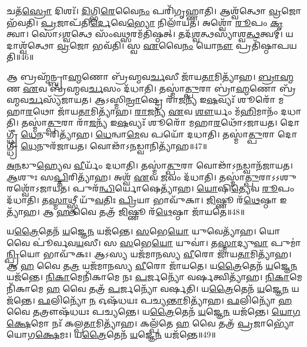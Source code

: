 𑌚𑌤᳴\-\ul{𑌸𑍍𑌰𑍋} 𑌦𑌿𑌶𑌃᳴।
\-\ul{𑌦𑌿}\-𑌗𑍍𑌭𑌿\-\ul{𑌰𑍇}\-𑌵𑍈\-\ul{𑌨𑌂} 𑌪𑌰𑌿᳴𑌗𑍃𑌹𑍍𑌣𑌾𑌤𑌿।
𑌆𑌶𑍍𑌵᳴𑌤𑍍𑌥𑍋 \ul{𑌵𑍍𑌰}\-𑌜𑍋 𑌭᳴𑌵𑌤𑌿।
\-\ul{𑌪𑍍𑌰}\-𑌜𑌾𑌪᳴𑌤𑌿\-\ul{𑌰𑍍𑌦𑍇}\-𑌵𑍇\-\ul{𑌭𑍍𑌯𑍋} 𑌨𑌿𑌲𑌾᳴𑌯𑌤।
𑌅𑌶𑍍𑌵𑍋᳴ \ul{𑌰𑍂}\-𑌪𑌂 \ul{𑌕𑍃}\-𑌤𑍍𑌵𑌾।
𑌸𑍋॑𑌽\-\ul{𑌶𑍍𑌵}\-𑌤𑍍𑌥𑍇 𑌸𑌂᳴𑌵\-\ul{𑌥𑍍𑌸}\-𑌰𑌮᳴𑌤𑌿𑌷𑍍𑌠𑌤𑍍।
𑌤𑌦᳴\-\ul{𑌶𑍍𑌵}\-𑌤𑍍𑌥𑌸𑍍𑌯𑌾॑𑌶𑍍𑌵\-\ul{𑌤𑍍𑌥}\-𑌤𑍍𑌵𑌮𑍍।
𑌯𑌦𑌾𑌶𑍍𑌵᳴𑌤𑍍𑌥𑍋 \ul{𑌵𑍍𑌰}\-𑌜𑍋 𑌭𑌵᳴𑌤𑌿।
𑌸𑍍𑌵 \ul{𑌏}\-𑌵𑍈\-\ul{𑌨𑌂} 𑌯𑍋\-\ul{𑌨𑍗} 𑌪𑍍𑌰𑌤𑌿᳴\-𑌷𑍍𑌠𑌾𑌪𑌯𑌤𑌿॥46॥\anuvakamend[\-\ul{𑌤𑍍𑌰𑌿}\-𑌷𑍍𑌟𑍁\-\ul{𑌭}\-𑌶𑍍𑌛\-\ul{𑌨𑍍𑌦}\-𑌸𑍋𑌽\-\ul{𑌧𑌿} 𑌨𑌿𑌰𑍍𑌮𑌿᳴𑌮𑍀𑌤𑍇 𑌜𑍁𑌹𑍋\-\ul{𑌤𑌿} 𑌨𑌵᳴ 𑌚]

𑌆 𑌬𑍍𑌰𑌹𑍍𑌮᳴𑌨𑍍𑌬𑍍𑌰𑌾\-\ul{𑌹𑍍𑌮}\-𑌣𑍋 𑌬𑍍𑌰᳴𑌹𑍍𑌮𑌵\-\ul{𑌰𑍍𑌚}\-𑌸𑍀 𑌜𑌾᳴𑌯\-\ul{𑌤𑌾}\-𑌮𑌿𑌤𑍍𑌯𑌾᳴𑌹।
\-\ul{𑌬𑍍𑌰𑌾}\-\-\ul{𑌹𑍍𑌮}\-𑌣 \ul{𑌏}\-𑌵 𑌬𑍍𑌰᳴𑌹𑍍𑌮𑌵\-\ul{𑌰𑍍𑌚}\-𑌸𑌂 𑌦᳴𑌧𑌾𑌤𑌿।
𑌤𑌸𑍍𑌮𑌾॑\-\ul{𑌤𑍍𑌪𑍁}\-𑌰𑌾 𑌬𑍍𑌰𑌾॑\-\ul{𑌹𑍍𑌮}\-𑌣𑍋 𑌬𑍍𑌰᳴𑌹𑍍𑌮𑌵\-\ul{𑌰𑍍𑌚}\-𑌸𑍍𑌯᳴𑌜𑌾𑌯𑌤।
𑌆𑌽𑌸𑍍𑌮𑌿\-\ul{𑌨𑍍𑌰𑌾}\-𑌷𑍍𑌟𑍍𑌰𑍇 𑌰𑌾᳴\-\ul{𑌜}\-𑌨𑍍𑌯᳴ 𑌇\-\ul{𑌷}\-𑌵𑍍𑌯𑌃᳴ 𑌶𑍂𑌰𑍋᳴ 𑌮𑌹𑌾\-\ul{𑌰}\-𑌥𑍋 𑌜𑌾᳴𑌯\-\ul{𑌤𑌾}\-𑌮𑌿𑌤𑍍𑌯𑌾᳴𑌹।
\-\ul{𑌰𑌾}\-\-\ul{𑌜}\-𑌨𑍍𑌯᳴ \ul{𑌏}\-𑌵 \ul{𑌶𑍗}\-𑌰𑍍𑌯𑌂 𑌮᳴\-\ul{𑌹𑌿}\-𑌮𑌾𑌨𑌂᳴ 𑌦𑌧𑌾𑌤𑌿।
𑌤𑌸𑍍𑌮𑌾॑\-\ul{𑌤𑍍𑌪𑍁}\-𑌰𑌾 𑌰𑌾᳴\-\ul{𑌜}\-𑌨𑍍𑌯᳴ 𑌇\-\ul{𑌷}\-𑌵𑍍𑌯𑌃᳴ 𑌶𑍂𑌰𑍋᳴ 𑌮𑌹𑌾\-\ul{𑌰}\-𑌥𑍋᳴\-𑌽𑌜𑌾𑌯𑌤।
𑌦𑍋𑌗𑍍𑌧𑍍𑌰𑍀᳴ \ul{𑌧𑍇}\-𑌨𑍁𑌰𑌿𑌤𑍍𑌯𑌾᳴𑌹।
\-\ul{𑌧𑍇}\-𑌨𑍍𑌵𑌾\-\ul{𑌮𑍇}\-𑌵 𑌪𑌯𑍋᳴ 𑌦𑌧𑌾𑌤𑌿।
𑌤𑌸𑍍𑌮𑌾॑\-\ul{𑌤𑍍𑌪𑍁}\-𑌰𑌾 𑌦𑍋𑌗𑍍𑌧𑍍𑌰𑍀᳴ \ul{𑌧𑍇}\-𑌨𑍁𑌰᳴𑌜𑌾𑌯𑌤।
𑌵𑍋𑌢𑌾᳴\-𑌽\-\ul{𑌨}\-𑌡𑍍𑌵𑌾𑌨𑌿𑌤𑍍𑌯𑌾᳴𑌹॥47॥

\-\ul{𑌅}\-\-\ul{𑌨}\-𑌡𑍁\-\ul{𑌹𑍍𑌯𑍇}\-𑌵 \ul{𑌵𑍀}\-𑌰𑍍𑌯𑌂᳴ 𑌦𑌧𑌾𑌤𑌿।
𑌤𑌸𑍍𑌮𑌾॑\-\ul{𑌤𑍍𑌪𑍁}\-𑌰𑌾 𑌵𑍋𑌢𑌾᳴\-𑌽\-\ul{𑌨}\-𑌡𑍍𑌵𑌾𑌨᳴𑌜𑌾𑌯𑌤।
\-\ul{𑌆}\-𑌶𑍁𑌃 𑌸\-\ul{𑌪𑍍𑌤𑌿}\-𑌰𑌿𑌤𑍍𑌯𑌾᳴𑌹।
𑌅𑌶𑍍𑌵᳴ \ul{𑌏}\-𑌵 \ul{𑌜}\-𑌵𑌂 𑌦᳴𑌧𑌾𑌤𑌿।
𑌤𑌸𑍍𑌮𑌾॑\-\ul{𑌤𑍍𑌪𑍁}\-𑌰𑌾\-𑌽𑌽𑌶𑍁𑌰𑌶𑍍𑌵𑍋᳴\-𑌽𑌜𑌾𑌯𑌤।
𑌪𑍁𑌰᳴\-\ul{𑌨𑍍𑌧𑌿}\-𑌰𑍍𑌯𑍋𑌷𑍇𑌤𑍍𑌯𑌾᳴𑌹।
\-\ul{𑌯𑍋}\-𑌷𑌿\-\ul{𑌤𑍍𑌯𑍇}\-𑌵 \ul{𑌰𑍂}\-𑌪𑌂 𑌦᳴𑌧𑌾𑌤𑌿।
𑌤\-\ul{𑌸𑍍𑌮𑌾}\-𑌥𑍍𑌸𑍍𑌤𑍍𑌰𑍀 𑌯𑍁᳴\-\ul{𑌵}\-𑌤𑌿𑌃 \ul{𑌪𑍍𑌰𑌿}\-𑌯𑌾 𑌭𑌾𑌵𑍁᳴𑌕𑌾।
\-\ul{𑌜𑌿}\-𑌷𑍍𑌣𑍂 𑌰᳴\-\ul{𑌥𑍇}\-𑌷𑍍𑌠𑌾 𑌇𑌤𑍍𑌯𑌾᳴𑌹।
𑌆 \ul{𑌹} 𑌵𑍈 𑌤𑌤𑍍𑌰᳴ \ul{𑌜𑌿}\-𑌷𑍍𑌣𑍂 𑌰᳴\-\ul{𑌥𑍇}\-𑌷𑍍𑌠𑌾 𑌜𑌾᳴𑌯𑌤𑍇॥48॥

𑌯\-\ul{𑌤𑍍𑌰𑍈}\-𑌤𑍇𑌨᳴ \ul{𑌯}\-𑌜𑍍𑌞𑍇\-\ul{𑌨} 𑌯𑌜᳴𑌨𑍍𑌤𑍇।
\-\ul{𑌸}\-𑌭𑍇\-\ul{𑌯𑍋} 𑌯𑍁𑌵𑍇𑌤𑍍𑌯𑌾᳴𑌹।
𑌯𑍋 𑌵𑍈 𑌪𑍂॑𑌰𑍍𑌵𑌵\-\ul{𑌯}\-𑌸𑍀।
𑌸 \ul{𑌸}\-𑌭𑍇\-\ul{𑌯𑍋} 𑌯𑍁𑌵𑌾॑।
𑌤\-\ul{𑌸𑍍𑌮𑌾}\-𑌦𑍍𑌯𑍁\-\ul{𑌵𑌾} 𑌪𑍁𑌮𑌾॑\-\ul{𑌨𑍍𑌪𑍍𑌰𑌿}\-𑌯𑍋 𑌭𑌾𑌵𑍁᳴𑌕𑌃।
𑌆𑌽𑌸𑍍𑌯 𑌯𑌜᳴𑌮𑌾𑌨𑌸𑍍𑌯 \ul{𑌵𑍀}\-𑌰𑍋 𑌜𑌾᳴𑌯\-\ul{𑌤𑌾}\-𑌮𑌿𑌤𑍍𑌯𑌾᳴𑌹।
𑌆 \ul{𑌹} 𑌵𑍈 𑌤\-\ul{𑌤𑍍𑌰} 𑌯𑌜᳴𑌮𑌾𑌨𑌸𑍍𑌯 \ul{𑌵𑍀}\-𑌰𑍋 𑌜𑌾᳴𑌯𑌤𑍇।
𑌯\-\ul{𑌤𑍍𑌰𑍈}\-𑌤𑍇𑌨᳴ \ul{𑌯}\-𑌜𑍍𑌞𑍇\-\ul{𑌨} 𑌯𑌜᳴𑌨𑍍𑌤𑍇।
\-\ul{𑌨𑌿}\-\-\ul{𑌕𑌾}\-𑌮𑍇𑌨𑌿᳴𑌕𑌾𑌮𑍇 𑌨𑌃 \ul{𑌪}\-𑌰𑍍𑌜𑌨𑍍𑌯𑍋᳴ 𑌵𑌰𑍍\mbox{}\-\ul{𑌷}\-𑌤𑍍𑌵𑌿𑌤𑍍𑌯𑌾᳴𑌹।
\-\ul{𑌨𑌿}\-\-\ul{𑌕𑌾}\-𑌮𑍇𑌨𑌿᳴𑌕𑌾𑌮𑍇 \ul{𑌹} 𑌵𑍈 𑌤𑌤𑍍𑌰᳴ \ul{𑌪}\-𑌰𑍍𑌜𑌨𑍍𑌯𑍋᳴ 𑌵𑌰𑍍\mbox{}𑌷𑌤𑌿।
𑌯\-\ul{𑌤𑍍𑌰𑍈}\-𑌤𑍇𑌨᳴ \ul{𑌯}\-𑌜𑍍𑌞𑍇\-\ul{𑌨} 𑌯𑌜᳴𑌨𑍍𑌤𑍇।
\-\ul{𑌫}\-𑌲𑌿𑌨𑍍𑌯𑍋᳴ \ul{𑌨} 𑌓𑌷᳴𑌧𑌯𑌃 𑌪𑌚𑍍𑌯\-\ul{𑌨𑍍𑌤𑌾}\-𑌮𑌿𑌤𑍍𑌯𑌾᳴𑌹।
\-\ul{𑌫}\-𑌲𑌿𑌨𑍍𑌯𑍋᳴ \ul{𑌹} 𑌵𑍈 𑌤𑌤𑍍𑌰𑍗𑌷᳴𑌧𑌯𑌃 𑌪𑌚𑍍𑌯𑌨𑍍𑌤𑍇।
𑌯\-\ul{𑌤𑍍𑌰𑍈}\-𑌤𑍇𑌨᳴ \ul{𑌯}\-𑌜𑍍𑌞𑍇\-\ul{𑌨} 𑌯𑌜᳴𑌨𑍍𑌤𑍇।
\-\ul{𑌯𑍋}\-\-\ul{𑌗}\-\-\ul{𑌕𑍍𑌷𑍇}\-𑌮𑍋 𑌨𑌃᳴ 𑌕𑌲𑍍𑌪\-\ul{𑌤𑌾}\-𑌮𑌿𑌤𑍍𑌯𑌾᳴𑌹।
𑌕𑌲𑍍𑌪᳴𑌤𑍇 \ul{𑌹} 𑌵𑍈 𑌤𑌤𑍍𑌰᳴ \ul{𑌪𑍍𑌰}\-𑌜𑌾𑌭𑍍𑌯𑍋᳴ 𑌯𑍋𑌗\-\ul{𑌕𑍍𑌷𑍇}\-𑌮𑌃।
𑌯\-\ul{𑌤𑍍𑌰𑍈}\-𑌤𑍇𑌨᳴ \ul{𑌯}\-𑌜𑍍𑌞𑍇\-\ul{𑌨} 𑌯𑌜᳴𑌨𑍍𑌤𑍇॥49॥\anuvakamend[\-\ul{𑌅}\-\-\ul{𑌨}\-𑌡𑍍𑌵𑌾𑌨𑌿𑌤𑍍𑌯𑌾᳴𑌹 𑌜𑌾𑌯𑌤𑍇 𑌵𑌰𑍍‌\mbox{}𑌷𑌤𑌿 \ul{𑌸}\-𑌪𑍍𑌤 𑌚᳴]

